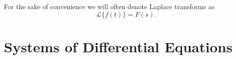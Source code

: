 \begin{notation}
For the sake of convenience we will often denote Laplace transforms as
\[ \mathcal{L}\{{f(t)}\}=F(s). \]
\end{notation}

\section{Systems of Differential Equations}


